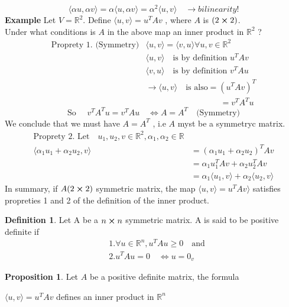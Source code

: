 \documentclass[
12pt,
]{article}
\newcommand{\la}{\langle}
\newcommand{\ra}{\rangle}
\theoremstyle{definition}
\theoremstyle{definition}
\theoremstyle{definition}
\newtheorem{Definition}{Definition}[section]
\theoremstyle{definition}
\newtheorem{Proposition}{Proposition}[section]
\begin{document}
\begin{equation*}
 \la  \alpha u , \alpha v\ra = \alpha \la  u,\alpha v \ra =\alpha^2  \la  u,v \ra \quad \xrightarrow{} bilinearity !
\end{equation*}
\textbf{Example} Let $V = \mathbb{R}^2$. Define $ \la  u,v\ra = u^{T} Av $ , where $A$ is $(2\cross 2)$. \\
Under what conditions is $A$ in the above map an inner product in $\mathbb{R}^2$ ?
\begin{align*}
\text{Proprety 1. (Symmetry)} & \la  u,v\ra =  \la  v,u\ra \forall u,v \in \mathbb{R}^2 \\
	&  \la  u,v\ra \quad \text{is by definition } u^{T}Av \\
	&  \la  v,u\ra \quad \text{is by definition } v^{T}Au \\
	& \xrightarrow{}  \la  u,v\ra \quad \text{is also} = (u^{T}Av)^{T}\\
	& \qquad \qquad \qquad \qquad  \quad = v^{T}A^{T}u 
\end{align*}
\begin{equation*}
\text{So } \quad v^{T}A^{T}u = v^{T}Au \quad \iff A = A^T \quad \text{(Symmetry)}
\end{equation*}
We conclude that we must have $A = A^T$ , i.e $A$ myst be a symmetryc matrix.
\begin{align*}
\text{Proprety 2. } \text{Let} \quad u_1, u_2, v \in \mathbb{R}^2 , \alpha_1, \alpha_2 \in \mathbb{R}\\
 \la  \alpha_1 u_1 + \alpha_2 u_2 ,v\ra &= (\alpha_1 u_1 + \alpha_2 u_2 )^{T}Av \\
& = \alpha_1 u_{1}^{T}Av + \alpha_2 u_{2}^{T}Av \\
& = \alpha_1  \la  u_1, v\ra + \alpha_2  \la  u_2, v \ra 
\end{align*}
In summary, if $A(2\cross 2)$ symmetric matrix, the map $ \la  u,v\ra = u^{T}Av \ra $ satisfies propreties 1 and 2 of the definition of the inner product.
\begin{Definition}
	Let A be a $n\cross n$ symmetric matrix. A is said to be positive definite if 
	\begin{align*}
	&1.\forall u \in \mathbb{R}^n , u^{T}Au \geq 0 \quad \text{and} \\
	&2. u^{T}Au =0 \quad \iff u = 0_v
	\end{align*}
\end{Definition}
\begin{Proposition}
	Let $A$ be a positive definite matrix, the formula \newline
	\begin{center}
		$ \la  u,v\ra = u^{T}Av $ defines an inner product in $\mathbb{R}^n$
	\end{center}
\end{Proposition}
\end{document}
